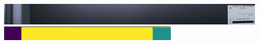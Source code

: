 \begin{center}\begin{minipage}[t]{\textwidth}
\includegraphics[width=\textwidth]{Images/ExampleImage2.png}\label{pic:ExampleImage2}
\includegraphics[width=\textwidth]{Images/m_ExampleLabel2.png}\label{pic:ExampleLabel2}
\end{minipage}\end{center}
